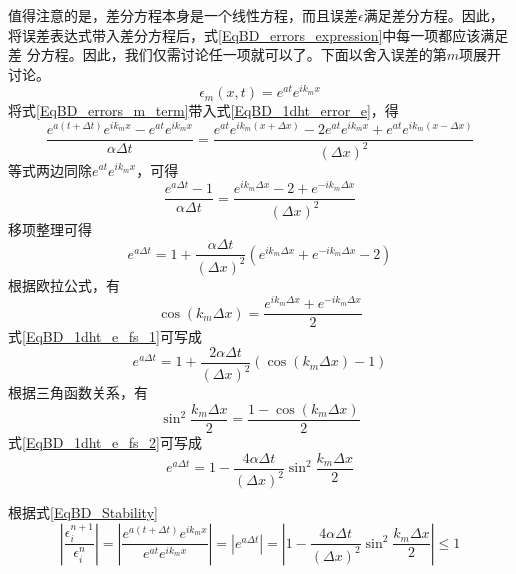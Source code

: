 值得注意的是，差分方程本身是一个线性方程，而且误差$\epsilon$满足差分方程。因此，
将误差表达式带入差分方程后，式\eqref{EqBD_errors_expression}中每一项都应该满足差
分方程。因此，我们仅需讨论任一项就可以了。下面以舍入误差的第$m$项展开讨论。
\begin{equation}
  \epsilon_{m}(x,t) = e^{at}e^{ik_{m}x}
  \label{EqBD_errors_m_term}
\end{equation}
将式\eqref{EqBD_errors_m_term}带入式\eqref{EqBD_1dht_error_e}，得
\begin{equation}
  \frac{e^{a(t+\Delta t)}e^{ik_{m}x}-e^{at}e^{ik_{m}x}}{\alpha\Delta t}
  =
  \frac{e^{at}e^{ik_{m}(x+\Delta x)}-2e^{at}e^{ik_{m}x}+e^{at}e^{ik_{m}(x-\Delta
  x)}}{(\Delta x)^{2}}
  \label{EqBD_1dht_error_e_fs}
\end{equation}
等式两边同除$e^{at}e^{ik_{m}x}$，可得
\begin{equation}
  \frac{e^{a\Delta t}-1}{\alpha\Delta t}
  =
  \frac{e^{ik_{m}\Delta x}-2+e^{-ik_{m}\Delta x}}{(\Delta x)^{2}}
\end{equation}
移项整理可得
\begin{equation}
e^{a\Delta t} =
1
+
\frac{\alpha \Delta t}{(\Delta x)^{2}}
(e^{ik_{m}\Delta x}+e^{-ik_{m}\Delta x}-2)
\label{EqBD_1dht_e_fs_1}
\end{equation}
根据欧拉公式，有
\begin{equation}
  \cos(k_{m}\Delta x) = 
  \frac{e^{ik_{m}\Delta x}+e^{-ik_{m}\Delta x}}
  {2}
\end{equation}
式\eqref{EqBD_1dht_e_fs_1}可写成
\begin{equation}
e^{a\Delta t} =
1
+
\frac{2\alpha \Delta t}{(\Delta x)^{2}}
(\cos(k_{m}\Delta x)-1)
\label{EqBD_1dht_e_fs_2}
\end{equation}
根据三角函数关系，有
\begin{equation}
  \sin^{2}\frac{k_{m}\Delta x}{2}
  =
  \frac{1-\cos(k_{m}\Delta x)}{2}
\end{equation}
式\eqref{EqBD_1dht_e_fs_2}可写成
\begin{equation}
e^{a\Delta t} =
1
-
\frac{4\alpha \Delta t}{(\Delta x)^{2}}
\sin^{2}\frac{k_{m}\Delta x}{2}
\label{EqBD_1dht_e_fs_3}
\end{equation}

根据式\eqref{EqBD_Stability}
\begin{equation}
\left|
  \frac{\epsilon_{i}^{n+1}}{\epsilon_{i}^{n}}
\right|
  =
  \left|
  \frac{e^{a(t+\Delta t)}e^{ik_{m}x}}{e^{at}e^{ik_{m}x}}
  \right|
=
\left|e^{a\Delta t}\right|
=
\left|
1
-
\frac{4\alpha \Delta t}{(\Delta x)^{2}}
\sin^{2}\frac{k_{m}\Delta x}{2}
\right|
\le 
1
\end{equation}

